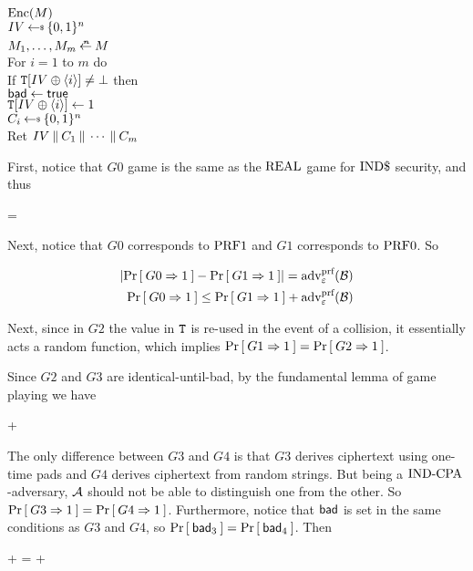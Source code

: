 {\underline{$\textnormal{Enc}(M)$}\\
$\IV \getsr \bits^n$\\
$M_1,\ldots,M_m \getparse{n} M$\\
For $i = 1$ to $m$ do\\
\myInd If $\mathtt{T}[IV\oplus \langle i \rangle] \ne \bot$ then\\
\myInd\myInd $\mathsf{bad}\gets\mathsf{true}$\\
\myInd $\mathtt{T}[IV \oplus \langle i\rangle] \gets 1 $\\
\myInd $C_i \getsr \bits^n$\\
Ret $IV \: \| \: C_1 \: \| \:\cdots\: \| \: C_m$
}

First, notice that $G0$ game is the same as the $\textnormal{REAL}$ game for $\textnormal{IND\$}$
security, and thus

\bnm
{} = 
\enm

Next, notice that $G0$ corresponds to $\textup{PRF1}$ and $G1$ corresponds to
$\textup{PRF0}$. So

\begin{align*}
  \lvert\Pr\left[\: G0 \Rightarrow 1 \:\right] - \Pr\left[\: G1 \Rightarrow 1 \:\right]\rvert = \textnormal{adv}^{\textup{prf}}_{\varepsilon}({\mathcal B}) \\
  \Pr\left[\: G0 \Rightarrow 1 \:\right] \leq \Pr\left[\: G1 \Rightarrow 1 \:\right] + \textnormal{adv}^{\textup{prf}}_{\varepsilon}({\mathcal B}) \\
\end{align*}

Next, since in $G2$ the value in $\mathtt{T}$ is re-used in the event of a collision,
it essentially acts a random function, which implies
$\Pr\left[\: G1 \Rightarrow 1 \:\right] = \Pr\left[\: G2 \Rightarrow 1 \:\right]$.

Since $G2$ and $G3$ are identical-until-bad, by the fundamental lemma of
game playing we have

\bnm
{} \leq {} + 
\enm

The only difference between $G3$ and $G4$ is that $G3$ derives ciphertext
using one-time pads and $G4$ derives ciphertext from random strings. But being
a $\textnormal{IND-CPA}$-adversary, ${\mathcal A}$ should not be able to distinguish one from the
other. So $\Pr\left[\: G3 \Rightarrow 1 \:\right] = \Pr\left[\: G4 \Rightarrow 1 \:\right]$.
Furthermore, notice that $\mathsf{bad}$ is set in the same conditions as $G3$ and $G4$,
so $\Pr\left[\: \mathsf{bad}_3 \:\right] = \Pr\left[\: \mathsf{bad}_4 \:\right]$. Then

\bnm
{} +  =  + 
\enm

